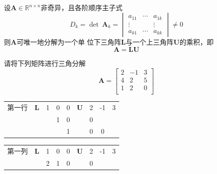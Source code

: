\begin{theorem}
    设$\boldsymbol{A}\in \mathbb{R}^{n\times n}$非奇异，且各阶顺序主子式
    \[
        D_k=\det\:\boldsymbol{A}_k=
        \begin{vmatrix}
            a_{11}&\cdots&a_{1k}\\
            \vdots&&\vdots\\
            a_{k1}&\cdots&a_{kk}
        \end{vmatrix}\neq0
    \]
    则$\boldsymbol{A}$可唯一地分解为一个单 位下三角阵$\boldsymbol{L}$与一个上三角阵$\boldsymbol{U}$的乘积，即
    \[
        \boldsymbol{A} = \boldsymbol{LU}
    \]
\end{theorem}
\begin{example}
    请将下列矩阵进行三角分解
    \[
        \boldsymbol{A} = 
        \begin{bmatrix}
            2   & -1  & 3 \\
            4   & 2   & 5 \\
            1   & 2   & 0 \\
        \end{bmatrix}
    \]
    \begin{solution}
        \begin{table}[H]
            \centering
            \begin{tabular}{cc|c|c|c|c|c|c|c|}
                \cline{3-5}\cline{7-9}    第一行 & $\boldsymbol{L}$ & 1   & 0   & 0   & $\boldsymbol{U}$ & \cellcolor[rgb]{ 1,  1,  0}2 & \cellcolor[rgb]{ 1,  1,  0}-1 & \cellcolor[rgb]{ 1,  1,  0}3 \bigstrut\\
                \cline{3-5}\cline{7-9}        &     &     & 1   & 0   &     & 0   &     &  \bigstrut\\
                \cline{3-5}\cline{7-9}        &     &     &     & 1   &     & 0   & 0   &  \bigstrut\\
                \cline{3-5}\cline{7-9}    
        \end{tabular}%
        \end{table}
        \begin{table}[H]
            \centering
            \begin{tabular}{cc|c|c|c|c|c|c|c|}
                \cline{3-5}\cline{7-9}    第一列 & $\boldsymbol{L}$ & 1   & 0   & 0   & $\boldsymbol{U}$ & 2   & -1  & 3 \bigstrut\\
                \cline{3-5}\cline{7-9}        &     & \cellcolor[rgb]{ 1,  1,  0}2 & 1   & 0   &     & 0   &     &  \bigstrut\\

\end{tabular}
\end{table}
\end{solution}
\end{example}

